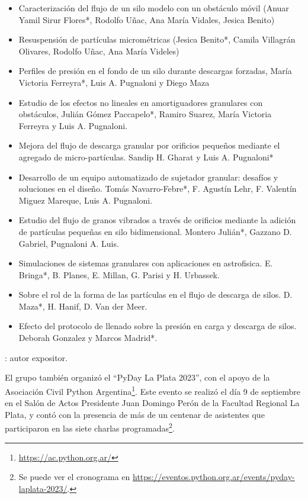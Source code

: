 \documentclass[a4paper,11pt,twoside,final,titlepage,onecolumn,openright]{report}
\begin{document}
\begin{itemize}
 \item Caracterización del flujo de un silo modelo con un obstáculo móvil (Anuar Yamil Sirur Flores*, Rodolfo Uñac, Ana María Vidales, Jesica Benito) 
 
 \item Resuspensión de partículas micrométricas (Jesica Benito*, Camila Villagrán Olivares, Rodolfo Uñac, Ana María Videles)
 
 \item Perfiles de presión en el fondo de un silo durante descargas forzadas, María Victoria Ferreyra*, Luis A. Pugnaloni y Diego Maza
 
 \item Estudio de los efectos no lineales en amortiguadores granulares con obstáculos, Julián Gómez Paccapelo*, Ramiro Suarez, María Victoria Ferreyra y Luis A. Pugnaloni.
 
 \item Mejora del flujo de descarga granular por orificios pequeños mediante el agregado de micro-partículas. Sandip H. Gharat y Luis A. Pugnaloni*
 
 \item Desarrollo de un equipo automatizado de sujetador granular: desafíos y soluciones en el diseño. Tomás Navarro-Febre*,  F. Agustín Lehr, F. Valentín Miguez Mareque, Luis A. Pugnaloni.
 
\item Estudio del flujo de granos vibrados a través de orificios mediante la adición de partículas pequeñas en silo bidimensional. Montero Julián*, Gazzano D. Gabriel, Pugnaloni A. Luis.

\item Simulaciones de sistemas granulares con aplicaciones en astrofisica. E. Bringa*, B. Planes, E. Millan, G. Parisi y H. Urbassek.

\item Sobre el rol de la forma de las partículas en el flujo de descarga de silos. D. Maza*, H. Hanif, D. Van der Meer.

\item Efecto del protocolo de llenado sobre la presión en carga y descarga de silos. Deborah Gonzalez y Marcos Madrid*.
\end{itemize}

{\small *: autor expositor.}

El grupo también organizó el ``PyDay La Plata 2023'', con el apoyo de la Asociación Civil Python Argentina\footnote{\url{https://ac.python.org.ar/}}. Este evento se realizó el día 9 de septiembre en el Salón de Actos Presidente Juan Domingo Perón de la Facultad Regional La Plata, y contó con la presencia de más de un centenar de asistentes que participaron en las siete charlas programadas\footnote{Se puede ver el cronograma en \url{https://eventos.python.org.ar/events/pyday-laplata-2023/}.}.
\end{document}
